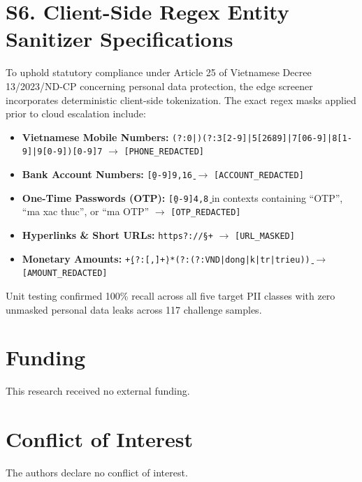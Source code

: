 \documentclass[journal]{IEEEtran}
\begin{document}
\section{S6. Client-Side Regex Entity Sanitizer Specifications}
\label{sec:supp_sanitizer}

To uphold statutory compliance under Article 25 of Vietnamese Decree 13/2023/ND-CP concerning personal data protection, the edge screener incorporates deterministic client-side tokenization. The exact regex masks applied prior to cloud escalation include:
\begin{itemize}
    \item \textbf{Vietnamese Mobile Numbers:} \texttt{(?:0|)(?:3[2-9]|5[2689]|7[06-9]|8[1-9]|9[0-9])[0-9]{7}} $\rightarrow$ \texttt{[PHONE\_REDACTED]}
    \item \textbf{Bank Account Numbers:} \texttt{\b[0-9]{9,16}\b} $\rightarrow$ \texttt{[ACCOUNT\_REDACTED]}
    \item \textbf{One-Time Passwords (OTP):} \texttt{\b[0-9]{4,8}\b} in contexts containing ``OTP'', ``ma xac thuc'', or ``ma OTP'' $\rightarrow$ \texttt{[OTP\_REDACTED]}
    \item \textbf{Hyperlinks \& Short URLs:} \texttt{https?://\S+} $\rightarrow$ \texttt{[URL\_MASKED]}
    \item \textbf{Monetary Amounts:} \texttt{\b\d+(?:[\.,]\d+)*(?:\s*(?:VND|dong|k|tr|trieu))\b} $\rightarrow$ \texttt{[AMOUNT\_REDACTED]}
\end{itemize}

Unit testing confirmed 100\% recall across all five target PII classes with zero unmasked personal data leaks across 117 challenge samples.

\section*{Funding}
This research received no external funding.

\section*{Conflict of Interest}
The authors declare no conflict of interest.



\end{document}
